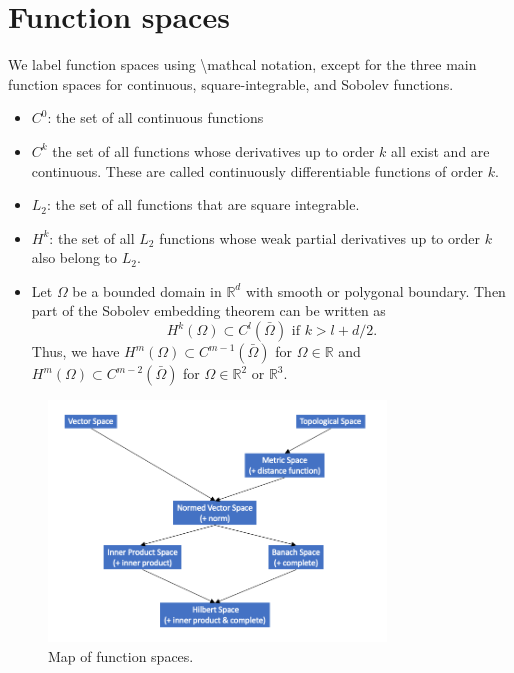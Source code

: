 \documentclass[oneside,a4paper,11pt]{report}
\begin{document}
\section{Function spaces}
We label function spaces using \textbackslash mathcal notation, except for the three main function spaces for continuous, square-integrable, and Sobolev functions. 
\begin{itemize}
    \item $C^0$: the set of all continuous functions
    \item $C^k$ the set of all functions whose derivatives up to order $k$ all exist and are continuous. These are called continuously differentiable functions of order $k$.
    \item $L_2$: the set of all functions that are square integrable.
    \item $H^k$: the set of all $L_2$ functions whose weak partial derivatives up to order $k$ also belong to $L_2$. 
    \item Let $\Omega$ be a bounded domain in $\mathbb{R}^d$ with smooth or polygonal boundary. Then part of the Sobolev embedding theorem can be written as
    \begin{equation}
        H^k(\Omega) \subset C^l(\bar{\Omega}) \text{ if } k > l + d/2.
    \end{equation}
    Thus, we have $H^m(\Omega) \subset C^{m-1}(\bar{\Omega})$ for $\Omega \in \mathbb{R}$ and $H^m(\Omega) \subset C^{m-2}(\bar{\Omega})$ for $\Omega \in \mathbb{R}^2$ or $\mathbb{R}^3$.
\end{itemize}

\begin{figure}[ht]
   \centering
   \includegraphics[width=0.8\textwidth]{../../images/function_spaces.png}
   \caption{Map of function spaces.}
   \label{fig:function_spaces}
\end{figure}
\end{document}
